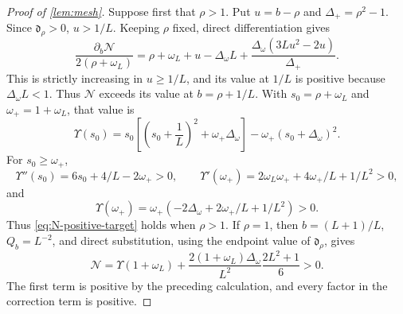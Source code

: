 \documentclass[review,hidelinks,onefignum,onetabnum]{siamart251216}
\begin{document}
\begin{proof}[Proof of \cref{lem:mesh}]
Suppose first that \(\rho>1\).  Put \(u=b-\rho\) and
\(\Delta_+=\rho^2-1\).  Since \(\mathfrak d_\rho>0\), \(u>1/L\).
Keeping \(\rho\) fixed,
direct differentiation gives
\[
 \frac{\partial_b\mathcal N}{2(\rho+\omega_L)}
 =\rho+\omega_L+u-\Delta_\omega L
 +\frac{\Delta_\omega(3Lu^2-2u)}{\Delta_+}.
\]
This is strictly increasing in \(u\geq1/L\), and its value at \(1/L\)
is positive because \(\Delta_\omega L<1\).  Thus \(\mathcal N\)
exceeds its value at
\(b=\rho+1/L\).  With
\(s_0=\rho+\omega_L\) and \(\omega_+=1+\omega_L\), that value is
\[
 \Upsilon(s_0)
 =s_0\left[\left(s_0+\frac1L\right)^2+\omega_+\Delta_\omega\right]
 -\omega_+(s_0+\Delta_\omega)^2.
\]
For \(s_0\geq\omega_+\),
\[
 \Upsilon''(s_0)=6s_0+4/L-2\omega_+>0,\qquad
 \Upsilon'(\omega_+)=2\omega_L\omega_++4\omega_+/L+1/L^2>0,
\]
and
\[
 \Upsilon(\omega_+)
 =\omega_+(-2\Delta_\omega+2\omega_+/L+1/L^2)>0.
\]
Thus \eqref{eq:N-positive-target} holds when \(\rho>1\).  If \(\rho=1\),
then \(b=(L+1)/L\), \(Q_b=L^{-2}\), and direct substitution, using the
endpoint value of \(\mathfrak d_\rho\), gives
\[
 \mathcal N=\Upsilon(1+\omega_L)
 +\frac{2(1+\omega_L)\Delta_\omega}{L^2}
   \frac{2L^2+1}{6}>0.
\]
The first term is positive by the preceding calculation, and every factor
in the correction term is positive.


\end{proof}
\end{document}
